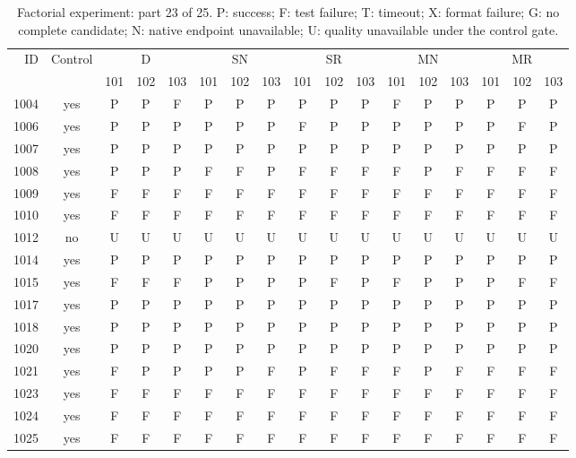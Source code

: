 \begin{table}[p]\centering\footnotesize
\setlength{\tabcolsep}{3pt}
\caption{Factorial experiment: part 23 of 25. P: success; F: test failure; T: timeout; X: format failure; G: no complete candidate; N: native endpoint unavailable; U: quality unavailable under the control gate.}
\begin{tabular*}{\textwidth}{@{\extracolsep{\fill}}rcccccccccccccccc}\toprule
ID & Control & \multicolumn{3}{c}{D} & \multicolumn{3}{c}{SN} & \multicolumn{3}{c}{SR} & \multicolumn{3}{c}{MN} & \multicolumn{3}{c}{MR}\\
\cmidrule(lr){3-5}\cmidrule(lr){6-8}\cmidrule(lr){9-11}\cmidrule(lr){12-14}\cmidrule(lr){15-17}
 & & 101 & 102 & 103 & 101 & 102 & 103 & 101 & 102 & 103 & 101 & 102 & 103 & 101 & 102 & 103\\\midrule
1004 & yes & P & P & F & P & P & P & P & P & P & F & P & P & P & P & P\\
1006 & yes & P & P & P & P & P & P & F & P & P & P & P & P & P & F & P\\
1007 & yes & P & P & P & P & P & P & P & P & P & P & P & P & P & P & P\\
1008 & yes & P & P & P & F & F & P & F & F & F & F & P & F & F & F & F\\
1009 & yes & F & F & F & F & F & F & F & F & F & F & F & F & F & F & F\\
1010 & yes & F & F & F & F & F & F & F & F & F & F & F & F & F & F & F\\
1012 & no & U & U & U & U & U & U & U & U & U & U & U & U & U & U & U\\
1014 & yes & P & P & P & P & P & P & P & P & P & P & P & P & P & P & P\\
1015 & yes & F & F & F & P & P & P & P & F & P & F & P & P & P & F & F\\
1017 & yes & P & P & P & P & P & P & P & P & P & P & P & P & P & P & P\\
1018 & yes & P & P & P & P & P & P & P & P & P & P & P & P & P & P & P\\
1020 & yes & P & P & P & P & P & P & P & P & P & P & P & P & P & P & P\\
1021 & yes & F & P & P & P & P & F & P & F & F & F & P & F & F & F & F\\
1023 & yes & F & F & F & F & F & F & F & F & F & F & F & F & F & F & F\\
1024 & yes & F & F & F & F & F & F & F & F & F & F & F & F & F & F & F\\
1025 & yes & F & F & F & F & F & F & F & F & F & F & F & F & F & F & F\\

\end{tabular*}
\end{table}
